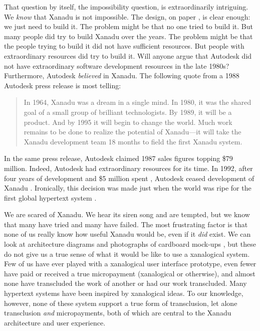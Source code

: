 \documentclass{acm_proc_article-sp}
\begin{document}
That question by itself, the impossibility question, is extraordinarily intriguing.  We \textit{know} that Xanadu is not impossible.  
The design, on paper \cite{NelsonLiteraryMachines}, is clear enough:  we just need to build it.  
The problem might be that no one tried to build it.  
But many people did try to build Xanadu over the years.  
The problem might be that the people trying to build it did not have sufficient resources.  But people with extraordinary resources did try to build it.  
Will anyone argue that Autodesk did not have extraordinary software development resources in the late 1980s?  
Furthermore, Autodesk \textit{believed} in Xanadu.  
The following quote from a 1988 Autodesk press release is most telling:

\begin{quote}
In 1964, Xanadu was a dream in a single mind.  In 1980, it was the
shared goal of a small group of brilliant technologists.  By 1989, it
will be a product.  And by 1995 it will begin to change the world.
Much work remains to be done to realize the potential of Xanadu---it
will take the Xanadu development team 18 months to field the first
Xanadu system. \cite{AutodeskPress} 
\end{quote}

In the same press release, Autodesk claimed 1987 sales figures topping \$79 million.  
Indeed, Autodesk had extraordinary resources for its time.  
In 1992, after four years of development and \$5 million spent \cite{AutodeskCost},  Autodesk ceased development of Xanadu \cite{AutodeskPressDrop}.
Ironically, this decision was made just when the world was ripe for the first global hypertext system \cite{BernersLee92}.

We are scared of Xanadu.  
We hear its siren song and are tempted, but we know that many have tried and many have failed.  
The most frustrating factor is that none of us really know how useful Xanadu would be, even if it \textit{did} exist.  
We can look at architecture diagrams and photographs of cardboard mock-ups \cite{Nelson1999}, but these do not give us a true sense of what it would be like to use a xanalogical system.
Few of us have ever played with a xanalogical user interface prototype, even fewer have paid or received a true micropayment (xanalogical or otherwise), and almost none have transcluded the work of another or had our work transcluded.
Many hypertext systems have been inspired by xanalogical ideas.
To our knowledge, however, none of these system support a true form of transclusion, let alone transclusion \textit{and} micropayments, both of which are central to the Xanadu architecture and user experience.
\end{document}
